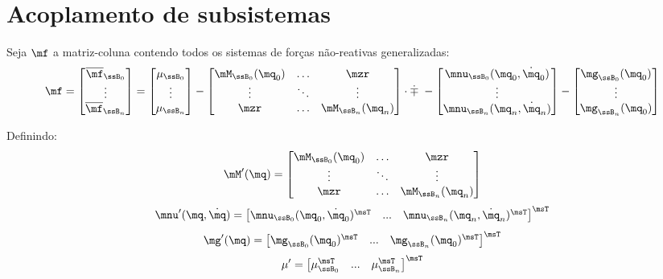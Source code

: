 \documentclass[]{politex}
\begin{document}
\section{Acoplamento de subsistemas} 

Seja $\mf$ a matriz-coluna contendo todos os sistemas de forças não-reativas generalizadas:
\begin{equation} \label{eq:fParalelos}
\mf = 
\begin{bmatrix}
\overline{\mf}_{\ssB_0} \\
\vdots \\
\overline{\mf}_{\ssB_n}  
\end{bmatrix}
=
\begin{bmatrix}
\mu_{\ssB_0} \\
\vdots \\
\mu_{\ssB_n} 
\end{bmatrix}
-
\begin{bmatrix}
\mM_{\ssB_0}(\mq_0) & \ldots & \mzr\\
\vdots & \ddots & \vdots\\
\mzr &\ldots  & \mM_{\ssB_n}(\mq_n)
\end{bmatrix}
\cdot
\dot{\mp} \;
-
\begin{bmatrix}
\mnu_{\ssB_0}(\mq_0,\dot{\mq}_0) \\
\vdots \\
\mnu_{\ssB_n}(\mq_n,\dot{\mq}_n)  
\end{bmatrix}
-
\begin{bmatrix}
\mg_{\ssB_0}(\mq_0) \\
\vdots \\
\mg_{\ssB_n}(\mq_0)  
\end{bmatrix}
\end{equation}

Definindo:
\begin{equation}
\mM'(\mq) =
\begin{bmatrix}
\mM_{\ssB_0}(\mq_0) & \ldots & \mzr\\
\vdots & \ddots & \vdots\\
\mzr &\ldots  & \mM_{\ssB_n}(\mq_n)
\end{bmatrix}
\end{equation}
\begin{equation}
\mnu'(\mq,\dot{\mq}) =
\begin{bmatrix}
\mnu_{\ssB_0}(\mq_0,\dot{\mq}_0)^\msT &
... &
\mnu_{\ssB_n}(\mq_n,\dot{\mq}_n)^\msT
\end{bmatrix}^\msT
\end{equation}
\begin{equation}
\mg'(\mq) =
\begin{bmatrix}
\mg_{\ssB_0}(\mq_0)^\msT &
... &
\mg_{\ssB_n}(\mq_0)^\msT  
\end{bmatrix}^\msT
\end{equation}
\begin{equation}
\mu' =
\begin{bmatrix}
\mu_{\ssB_0}^\msT &
... &
\mu_{\ssB_n}^\msT  
\end{bmatrix}^\msT
\end{equation}
\end{document}
